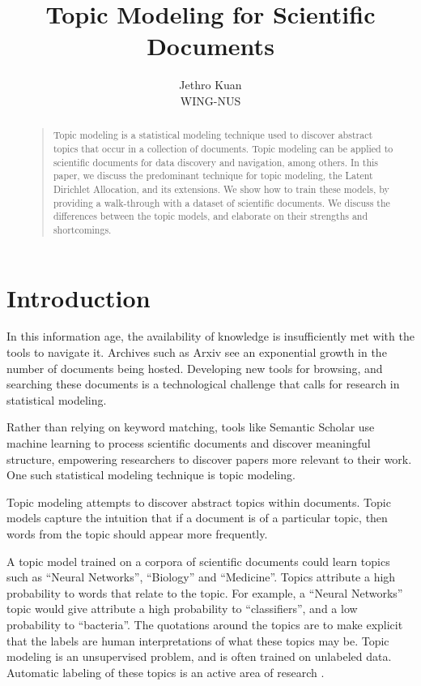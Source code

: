 \documentclass[letterpaper]{article}
\begin{document}
\nocopyright

\title{Topic Modeling for Scientific Documents}
\author{Jethro Kuan \\
  WING-NUS\\
}
\maketitle
\begin{abstract}
  \begin{quote}
    Topic modeling is a statistical modeling technique used to
    discover abstract topics that occur in a collection of documents.
    Topic modeling can be applied to scientific documents for data
    discovery and navigation, among others. In this paper, we discuss
    the predominant technique for topic modeling, the Latent Dirichlet
    Allocation, and its extensions. We show how to train these models,
    by providing a walk-through with a dataset of scientific
    documents. We discuss the differences between the topic models,
    and elaborate on their strengths and shortcomings.
  \end{quote}
\end{abstract}

\section{Introduction}
In this information age, the availability of knowledge is
insufficiently met with the tools to navigate it. Archives such as
Arxiv see an exponential growth in the number of documents being
hosted. Developing new tools for browsing, and searching these
documents is a technological challenge that calls for research in
statistical modeling.

Rather than relying on keyword matching, tools like Semantic Scholar
use machine learning to process scientific documents and discover
meaningful structure, empowering researchers to discover papers more
relevant to their work. One such statistical modeling technique is
topic modeling.

Topic modeling attempts to discover abstract topics within documents.
Topic models capture the intuition that if a document is of a
particular topic, then words from the topic should appear more
frequently.

A topic model trained on a corpora of scientific documents could learn
topics such as ``Neural Networks'', ``Biology'' and ``Medicine''.
Topics attribute a high probability to words that relate to the topic.
For example, a ``Neural Networks'' topic would give attribute a high
probability to ``classifiers'', and a low probability to ``bacteria''.
The quotations around the topics are to make explicit that the labels
are human interpretations of what these topics may be. Topic modeling
is an unsupervised problem, and is often trained on unlabeled data.
Automatic labeling of these topics is an active area of research
\cite{mei2007automatic, lau2011automatic}.
\end{document}
